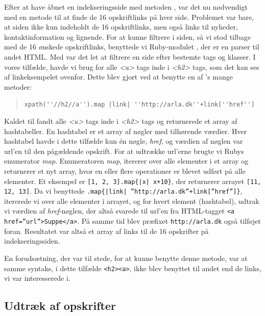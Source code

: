 Efter at have åbnet en indekseringsside med metoden , var det nu nødvendigt med en metode til at finde de 16 opskriftlinks på hver side. Problemet var bare, at siden ikke kun indeholdt de 16 opskriftlinks, men også links til nyheder, kontaktinformation og lignende. For at kunne filtrere i siden, så vi stod tilbage med de 16 ønskede opskriftlinks, benyttede vi Ruby-modulet \cite{rubygemnokogiri}, der er en parser til andet HTML. Med  var det let at filtrere en side efter bestemte tags og klasser. I vores tilfælde, havde vi brug for alle \textit{<a>} tags inde i \textit{<h2>} tags, som det kan ses af linkeksempelet ovenfor. Dette blev gjort ved at benytte en af 's mange metoder:

\begin{quote} 
 \lstinline{xpath(''//h2//a'').map |link| ''http://arla.dk''+link[''href'']}
\end{quote}

Kaldet til  fandt alle \textit{<a>} tags inde i \textit{<h2>} tags og returnerede et array af hashtabeller. En hashtabel er et array af nøgler med tilhørende værdier. Hver hashtabel havde i dette tilfælde kun én nøgle, \textit{href}, og værdien af nøglen var url'en til den pågældende opskrift. For at udtrække url'erne brugte vi Rubys enumerator \textit{map}. Enumeratoren \textit{map}, itererer over alle elementer i et array og returnerer et nyt array, hvor en eller flere operationer er blevet udført på alle elementer\cite{rubydoc}. Et eksempel er \texttt{[1, 2, 3].map\{|x| x+10\}}, der returnerer arrayet \texttt{[11, 12, 13]}. Da vi benyttede \texttt{.map\{|link| ''http://arla.dk''+link[''href'']\}}, itererede vi over alle elementer i arrayet, og for hvert element (hashtabel), udtrak vi værdien af \textit{href}-nøglen, der altså svarede til url'en fra HTML-tagget \texttt{<a href=''url''>Suppe</a>}. På samme tid blev præfixet \texttt{http://arla.dk} også tilføjet foran. Resultatet var altså et array af links til de 16 opskrifter på indekseringssiden.

En forudsætning, der var til stede, for at kunne benytte denne metode, var at samme syntaks, i dette tilfælde \lstinline{<h2><a>}, ikke blev benyttet til andet end de links, vi var interesserede i.


\subsection{Udtræk af opskrifter}

